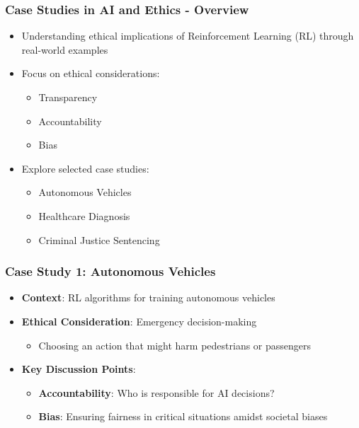 \documentclass[aspectratio=169]{beamer}
\begin{document}
\begin{frame}[fragile]
    \frametitle{Case Studies in AI and Ethics - Overview}
    \begin{itemize}
        \item Understanding ethical implications of Reinforcement Learning (RL) through real-world examples
        \item Focus on ethical considerations: 
        \begin{itemize}
            \item Transparency
            \item Accountability
            \item Bias
        \end{itemize}
        \item Explore selected case studies:
        \begin{itemize}
            \item Autonomous Vehicles
            \item Healthcare Diagnosis
            \item Criminal Justice Sentencing
        \end{itemize}
    \end{itemize}
\end{frame}

\begin{frame}[fragile]
    \frametitle{Case Study 1: Autonomous Vehicles}
    \begin{itemize}
        \item \textbf{Context}: RL algorithms for training autonomous vehicles
        \item \textbf{Ethical Consideration}: Emergency decision-making
        \begin{itemize}
            \item Choosing an action that might harm pedestrians or passengers
        \end{itemize}
        \item \textbf{Key Discussion Points}:
        \begin{itemize}
            \item \textbf{Accountability}: Who is responsible for AI decisions?
            \item \textbf{Bias}: Ensuring fairness in critical situations amidst societal biases
        \end{itemize}
    \end{itemize}
\end{frame}
\end{document}
